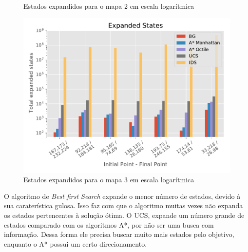 \begin{figure}[!htb]
\begin{minipage}{0.5\linewidth}
\caption{Estados expandidos para o mapa 2 em escala logarítmica}
\label{fig:expanded2}
\end{minipage}
\begin{minipage}{0.5\linewidth}
\centering
\includegraphics[width=\textwidth]{Images/Expanded_States_map3_log.pdf}
\caption{Estados expandidos para o mapa 3 em escala logarítmica}
\label{fig:expanded3}
\end{minipage}
\end{figure}

O algoritmo de \textit{Best first Search} expande o menor número de estados, devido à sua caraterística gulosa. Isso faz com que o algoritmo muitas vezes não expanda os estados pertencentes à solução ótima. O UCS, expande um número grande de estados comparado com os algoritmos A*, por não ser uma busca com informação. Dessa forma ele precisa buscar muito mais estados pelo objetivo, enquanto o A* possui um certo direcionamento.

